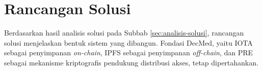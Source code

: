\section{Rancangan Solusi}
\label{sec:rancangan-solusi}

Berdasarkan hasil analisis solusi pada Subbab \ref{sec:analisis-solusi}, rancangan solusi menjelaskan bentuk sistem yang dibangun. Fondasi DecMed, yaitu IOTA sebagai penyimpanan \textit{on-chain}, IPFS sebagai penyimpanan \textit{off-chain}, dan PRE sebagai mekanisme kriptografis pendukung distribusi akses, tetap dipertahankan.







% 
